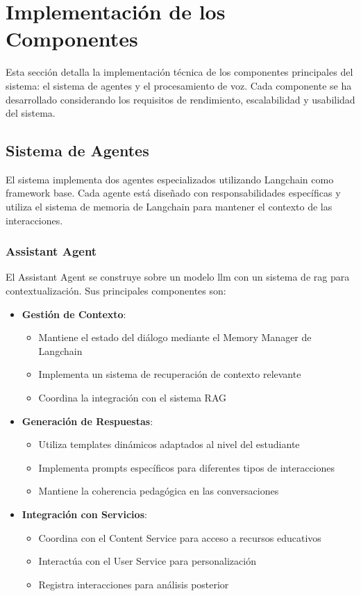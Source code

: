\section{Implementación de los Componentes}
\label{implementacion-componentes}

Esta sección detalla la implementación técnica de los componentes principales del sistema: el sistema de agentes y el procesamiento de voz. Cada componente se ha desarrollado considerando los requisitos de rendimiento, escalabilidad y usabilidad del sistema.

\subsection{Sistema de Agentes}
\label{implementacion-agentes}

El sistema implementa dos agentes especializados utilizando Langchain como framework base. Cada agente está diseñado con responsabilidades específicas y utiliza el sistema de memoria de Langchain para mantener el contexto de las interacciones.

\subsubsection{Assistant Agent}

El Assistant Agent se construye sobre un modelo \gls{llm} con un sistema de \gls{rag} para contextualización. Sus principales componentes son:

\begin{itemize}
    \item \textbf{Gestión de Contexto}:
    \begin{itemize}
        \item Mantiene el estado del diálogo mediante el Memory Manager de Langchain
        \item Implementa un sistema de recuperación de contexto relevante
        \item Coordina la integración con el sistema RAG
    \end{itemize}

    \item \textbf{Generación de Respuestas}:
    \begin{itemize}
        \item Utiliza templates dinámicos adaptados al nivel del estudiante
        \item Implementa prompts específicos para diferentes tipos de interacciones
        \item Mantiene la coherencia pedagógica en las conversaciones
    \end{itemize}

    \item \textbf{Integración con Servicios}:
    \begin{itemize}
        \item Coordina con el Content Service para acceso a recursos educativos
        \item Interactúa con el User Service para personalización
        \item Registra interacciones para análisis posterior
    \end{itemize}
\end{itemize}

